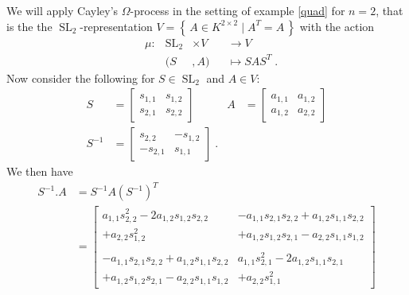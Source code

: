 \begin{example}\label{theex}
We will apply Cayley's $\Omega$-process in the setting of example \ref{quad} for $n=2$, that is the the $\operatorname{SL}_2$-representation $ V = \left\{ \, A \in K^{2 \times 2} \mid A^T = A \, \right\} $ with the action
  \begin{equation*}
    \begin{aligned}
      &\mu \colon & \operatorname{SL}_2 &\times  V&&  \longrightarrow  V \\
      && (  S  &,   A  )  &&\longmapsto  SAS^T \; .
    \end{aligned}
  \end{equation*}
  Now consider the following for $S \in \operatorname{SL}_2$ and $A \in V$:
  \begin{equation*}
    \begin{aligned}
      S &=
      \begin{bmatrix}
        s_{1,1} & s_{1,2} \\
        s_{2,1} & s_{2,2}
      \end{bmatrix}
      & A &=
      \begin{bmatrix}
        a_{1,1} & a_{1,2} \\
        a_{1,2} & a_{2,2}
      \end{bmatrix}
      \\
      S^{-1} &=
      \begin{bmatrix}
        s_{2,2} & -s_{1,2} \\
        -s_{2,1} & s_{1,1}
      \end{bmatrix} \; .
    \end{aligned}
  \end{equation*}
  We then have
  \begin{equation*}
    \begin{aligned}
      S^{-1}.A &= S^{-1}A\left(S^{-1}\right)^T  \\ &=
      \begin{bmatrix}
        a_{1,1}s_{2,2}^2 - 2a_{1,2}s_{1,2}s_{2,2} & -a_{1,1}s_{2,1}s_{2,2} + a_{1,2}s_{1,1}s_{2,2}\\
        + a_{2,2}s_{1,2}^2 &  + a_{1,2}s_{1,2}s_{2,1} - a_{2,2}s_{1,1}s_{1,2} \\
        &\\
        - a_{1,1}s_{2,1}s_{2,2} + a_{1,2}s_{1,1}s_{2,2} & a_{1,1}s_{2,1}^2 - 2a_{1,2}s_{1,1}s_{2,1}\\
        + a_{1,2}s_{1,2}s_{2,1} - a_{2,2}s_{1,1}s_{1,2} & + a_{2,2}s_{1,1}^2
      \end{bmatrix}

\end{aligned}
\end{equation*}
\end{example}
